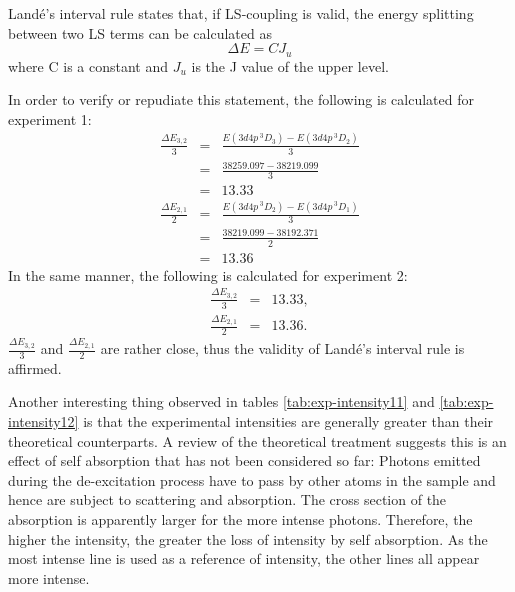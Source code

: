 \documentclass[a4paper]{article}
\begin{document}
Land\'e's interval rule states that, if LS-coupling is valid, the
energy splitting between two LS terms can be calculated as
\[
\Delta E = C J_u
\]
where C is a constant and $J_u$ is the J value of the upper level.

In order to verify or repudiate this statement, the following is
calculated for experiment 1:
\begin{eqnarray*}
\frac{\Delta E_{3,2}}{3} &=& \frac{E(3d4p\,^3D_3) -
  E(3d4p\,^3D_2)}{3}\\
&=& \frac{38259.097 - 38219.099}{3} \\
&=& 13.33 \\
\frac{\Delta E_{2,1}}{2} &=& \frac{E(3d4p\,^3D_2) -
  E(3d4p\,^3D_1)}{3}\\
&=& \frac{38219.099 - 38192.371}{2} \\
&=& 13.36
\end{eqnarray*}
In the same manner, the following is calculated for experiment 2:
\begin{eqnarray*}
\frac{\Delta E_{3,2}}{3} &=& 13.33,	\\
\frac{\Delta E_{2,1}}{2} &=& 13.36.
\end{eqnarray*}
$\frac{\Delta E_{3,2}}{3}$ and $\frac{\Delta E_{2,1}}{2}$ are rather
close, thus the validity of Land\'e's interval rule is affirmed.

Another interesting thing observed in tables \ref{tab:exp-intensity11} and \ref{tab:exp-intensity12}
is that the experimental intensities are generally greater than their
theoretical counterparts. A review of the theoretical treatment
suggests this is an effect of self absorption that has not been
considered so far: Photons emitted during the de-excitation process
have to pass by other atoms in the sample and hence are subject to
scattering and absorption. The cross section of the absorption is
apparently larger for the more intense photons. Therefore, the higher
the intensity, the greater the loss of intensity by self
absorption. As the most intense line is used as a reference of
intensity, the other lines all appear more intense.
\end{document}
